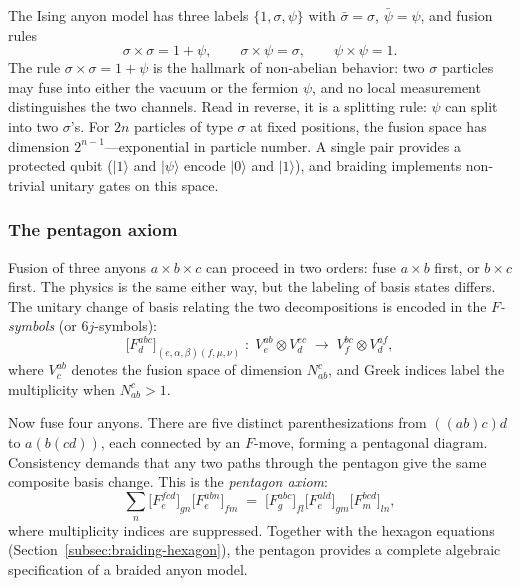 \begin{example}
\label{ex:ising-anyons}
The Ising anyon model has three labels $\{1, \sigma, \psi\}$ with
$\bar{\sigma} = \sigma$, $\bar{\psi} = \psi$, and fusion rules
\begin{equation}
\label{eq:ising-fusion}
    \sigma \times \sigma = 1 + \psi, \qquad
    \sigma \times \psi = \sigma, \qquad
    \psi \times \psi = 1.
\end{equation}
The rule $\sigma \times \sigma = 1 + \psi$ is the hallmark of non-abelian
behavior: two $\sigma$ particles may fuse into either the vacuum or the
fermion $\psi$, and no local measurement distinguishes the two channels.
Read in reverse, it is a splitting rule: $\psi$ can split into two $\sigma$'s.
For $2n$ particles of type $\sigma$ at fixed positions, the fusion space has
dimension $2^{n-1}$---exponential in particle number.  A single pair provides
a protected qubit ($|1\rangle$ and $|\psi\rangle$ encode $|0\rangle$ and
$|1\rangle$), and braiding implements non-trivial unitary gates on this space.
\end{example}

\subsubsection*{The pentagon axiom}

Fusion of three anyons $a \times b \times c$ can proceed in two orders: fuse
$a \times b$ first, or $b \times c$ first.  The physics is the same either way,
but the labeling of basis states differs.  The unitary change of basis relating
the two decompositions is encoded in the \emph{$F$-symbols} (or $6j$-symbols):
\begin{equation}
\label{eq:f-symbol}
    \bigl[F^{abc}_{d}\bigr]_{(e,\alpha,\beta)(f,\mu,\nu)} \;:\;
    V^{ab}_e \otimes V^{ec}_d \;\longrightarrow\;
    V^{bc}_f \otimes V^{af}_d,
\end{equation}
where $V^{ab}_c$ denotes the fusion space of dimension $N^c_{ab}$, and Greek
indices label the multiplicity when $N^c_{ab} > 1$.

Now fuse four anyons.  There are five distinct parenthesizations from
$((ab)c)d$ to $a(b(cd))$, each connected by an $F$-move, forming a pentagonal
diagram.  Consistency demands that any two paths through the pentagon give the
same composite basis change.  This is the \emph{pentagon axiom}:
\begin{equation}
\label{eq:pentagon}
    \sum_{n} \bigl[F^{fcd}_e\bigr]_{gn}
    \bigl[F^{abn}_e\bigr]_{fm}
    \;=\;
    \bigl[F^{abc}_g\bigr]_{fl}
    \bigl[F^{ald}_e\bigr]_{gm}
    \bigl[F^{bcd}_m\bigr]_{ln},
\end{equation}
where multiplicity indices are suppressed.  Together with the hexagon equations
(Section~\ref{subsec:braiding-hexagon}), the pentagon provides a complete
algebraic specification of a braided anyon model.

